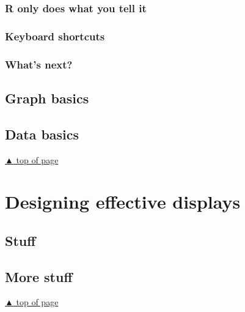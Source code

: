 \documentclass[
]{book}
\begin{document}
\hypertarget{r-only-does-what-you-tell-it}{%
\subsection{R only does what you tell it}\label{r-only-does-what-you-tell-it}}

\hypertarget{keyboard-shortcuts}{%
\subsection{Keyboard shortcuts}\label{keyboard-shortcuts}}

\hypertarget{whats-next}{%
\subsection{What's next?}\label{whats-next}}

\hypertarget{graph-basics}{%
\section{Graph basics}\label{graph-basics}}

\hypertarget{data-basics}{%
\section{Data basics}\label{data-basics}}

\protect\hyperlink{start-with-R}{▲ top of page}

\hypertarget{display-design}{%
\chapter{Designing effective displays}\label{display-design}}

\hypertarget{stuff-2}{%
\section{Stuff}\label{stuff-2}}

\hypertarget{more-stuff-2}{%
\section{More stuff}\label{more-stuff-2}}

\protect\hyperlink{display-design}{▲ top of page}

  
\end{document}
